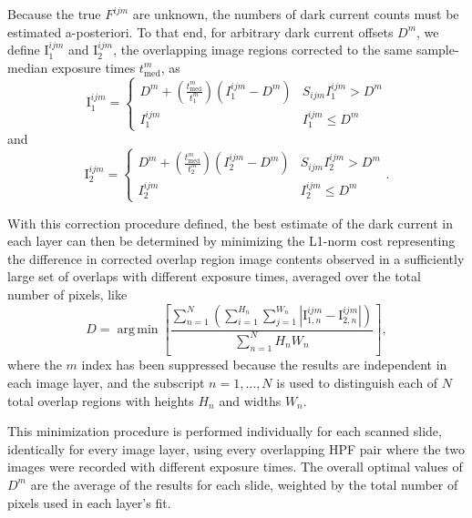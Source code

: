 \documentclass[letterpaper,11pt]{article}
\DeclareMathOperator*{\argmin}{arg\,min}
\newcommand{\Iota}{\mathrm{I}}
\begin{document}
Because the true $F^{ijm}$ are unknown, the numbers of dark current counts must be estimated a-posteriori. To that end, for arbitrary dark current offsets $D^{m}$, we define $\Iota^{ijm}_{1}$ and $\Iota^{ijm}_{2}$, the overlapping image regions corrected to the same sample-median exposure times $t^{m}_{\mathrm{med}}$, as
\begin{equation}
\Iota^{ijm}_{1} = 
\begin{cases} 
      D^{m}+\left(\frac{t^{m}_{\mathrm{med}}}{t^{m}_{1}}\right)\left(I^{ijm}_{1}-D^{m}\right) & S_{ijm} I^{ijm}_{1} > D^{m}  \\
      I^{ijm}_{1} & I^{ijm}_{1} \leq D^{m} 
\end{cases}
\label{eq:image_corr_def_1}
\end{equation}
and
\begin{equation}
\Iota^{ijm}_{2} = 
\begin{cases} 
      D^{m}+\left(\frac{t^{m}_{\mathrm{med}}}{t^{m}_{2}}\right)\left(I^{ijm}_{2}-D^{m}\right) & S_{ijm} I^{ijm}_{2} > D^{m}  \\
      I^{ijm}_{2} & I^{ijm}_{2} \leq D^{m} 
\end{cases}
.
\label{eq:image_corr_def_2}
\end{equation}

With this correction procedure defined, the best estimate of the dark current in each layer can then be determined by minimizing the L1-norm cost representing the difference in corrected overlap region image contents observed in a sufficiently large set of overlaps with different exposure times, averaged over the total number of pixels, like
\begin{equation}
D = \argmin{ \left[ \frac{ \sum_{n=1}^{N} \left( \sum_{i=1}^{H_{n}} \sum_{j=1}^{W_{n}} \left| \Iota^{ijm}_{1,n} - \Iota^{ijm}_{2,n} \right| \right) }{ \sum_{n=1}^{N} H_{n}W_{n}} \right] },
\label{eq:minimization_def}
\end{equation} 
where the $m$ index has been suppressed because the results are independent in each image layer, and the subscript $n=1,\ldots,N$ is used to distinguish each of $N$ total overlap regions with heights $H_{n}$ and widths $W_{n}$. 

This minimization procedure is performed individually for each scanned slide, identically for every image layer, using every overlapping HPF pair where the two images were recorded with different exposure times. The overall optimal values of $D^{m}$ are the average of the results for each slide, weighted by the total number of pixels used in each layer's fit.  
\end{document}
